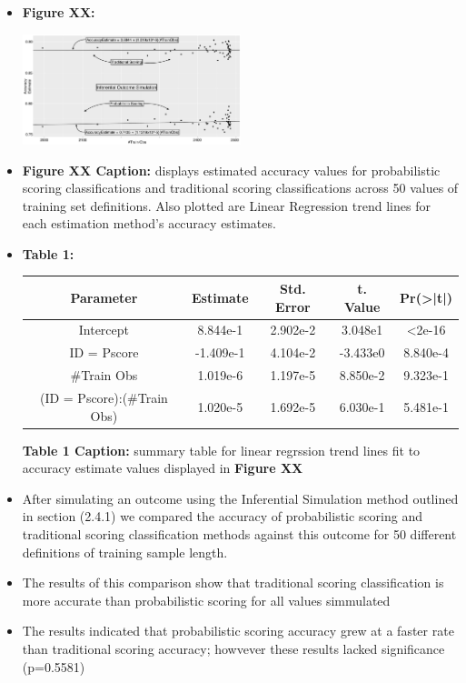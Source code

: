 \documentclass[12pt,]{article}
\begin{document}
\begin{itemize}
\item
  \textbf{Figure XX:}

  \begin{center}
  \includegraphics[width=0.5\textwidth]{Sup1Graph.jpg}
  \end{center}
\item
  \textbf{Figure XX Caption:} displays estimated accuracy values for
  probabilistic scoring classifications and traditional scoring
  classifications across 50 values of training set definitions. Also
  plotted are Linear Regression trend lines for each estimation method's
  accuracy estimates.
\item
  \textbf{Table 1:}

  \begin{center}
  \begin{tabular}{|c|c|c|c|c|}
  \hline
  Parameter                      & Estimate  & Std. Error & t. Value  & Pr(>|t|) \\
  \hline
  \hline
  Intercept                      &  8.844e-1 &  2.902e-2  &  3.048e1  & <2e-16   \\                             
  \hline
  ID = Pscore                    & -1.409e-1 &  4.104e-2  & -3.433e0  & 8.840e-4 \\
  \hline
  \#Train Obs                    &  1.019e-6 &  1.197e-5  &  8.850e-2 & 9.323e-1 \\
  \hline
  (ID = Pscore):(\#Train Obs) &  1.020e-5 &  1.692e-5  &  6.030e-1 & 5.481e-1 \\
  \hline
  \end{tabular}
  \end{center}

  \textbf{Table 1 Caption:} summary table for linear regrssion trend
  lines fit to accuracy estimate values displayed in \textbf{Figure XX}
\item
  After simulating an outcome using the Inferential Simulation method
  outlined in section (2.4.1) we compared the accuracy of probabilistic
  scoring and traditional scoring classification methods against this
  outcome for 50 different definitions of training sample length.
\item
  The results of this comparison show that traditional scoring
  classification is more accurate than probabilistic scoring for all
  values simmulated
\item
  The results indicated that probabilistic scoring accuracy grew at a
  faster rate than traditional scoring accuracy; howvever these results
  lacked significance (p=0.5581)
\end{itemize}
\end{document}
